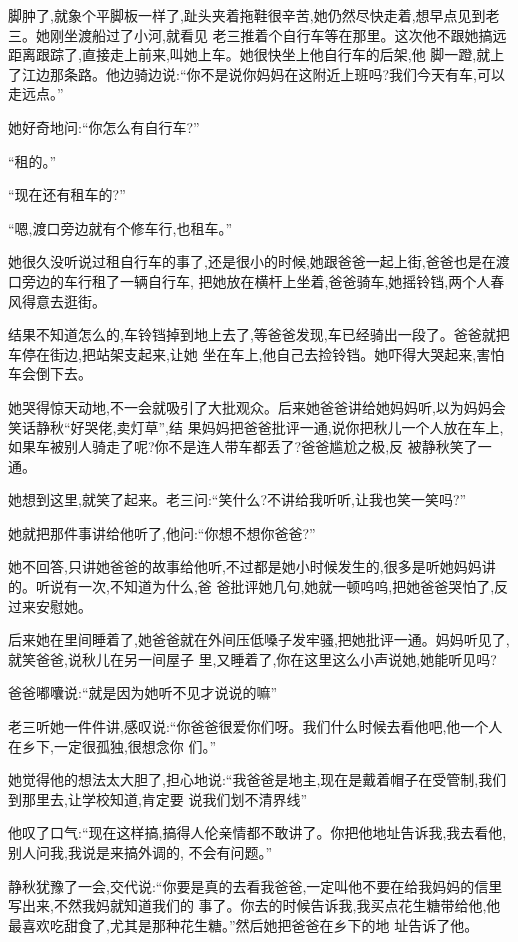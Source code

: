 ﻿\documentclass[12pt]{article}
\begin{document}
脚肿了,就象个平脚板一样了,趾头夹着拖鞋很辛苦,她仍然尽快走着,想早点见到老三。她刚坐渡船过了小河,就看见
老三推着个自行车等在那里。这次他不跟她搞远距离跟踪了,直接走上前来,叫她上车。她很快坐上他自行车的后架,他
脚一蹬,就上了江边那条路。他边骑边说:``你不是说你妈妈在这附近上班吗?我们今天有车,可以走远点。''

她好奇地问:``你怎么有自行车?''

``租的。''

``现在还有租车的?''

``嗯,渡口旁边就有个修车行,也租车。''

她很久没听说过租自行车的事了,还是很小的时候,她跟爸爸一起上街,爸爸也是在渡口旁边的车行租了一辆自行车,
把她放在横杆上坐着,爸爸骑车,她摇铃铛,两个人春风得意去逛街。

结果不知道怎么的,车铃铛掉到地上去了,等爸爸发现,车已经骑出一段了。爸爸就把车停在街边,把站架支起来,让她
坐在车上,他自己去捡铃铛。她吓得大哭起来,害怕车会倒下去。

她哭得惊天动地,不一会就吸引了大批观众。后来她爸爸讲给她妈妈听,以为妈妈会笑话静秋``好哭佬,卖灯草'',结
果妈妈把爸爸批评一通,说你把秋儿一个人放在车上,如果车被别人骑走了呢?你不是连人带车都丢了?爸爸尴尬之极,反
被静秋笑了一通。

她想到这里,就笑了起来。老三问:``笑什么?不讲给我听听,让我也笑一笑吗?''

她就把那件事讲给他听了,他问:``你想不想你爸爸?''

她不回答,只讲她爸爸的故事给他听,不过都是她小时候发生的,很多是听她妈妈讲的。听说有一次,不知道为什么,爸
爸批评她几句,她就一顿呜呜,把她爸爸哭怕了,反过来安慰她。

后来她在里间睡着了,她爸爸就在外间压低嗓子发牢骚,把她批评一通。妈妈听见了,就笑爸爸,说秋儿在另一间屋子
里,又睡着了,你在这里这么小声说她,她能听见吗?

爸爸嘟囔说:``就是因为她听不见才说说的嘛\myrule ''

老三听她一件件讲,感叹说:``你爸爸很爱你们呀。我们什么时候去看他吧,他一个人在乡下,一定很孤独,很想念你
们。''

她觉得他的想法太大胆了,担心地说:``我爸爸是地主,现在是戴着帽子在受管制,我们到那里去,让学校知道,肯定要
说我们划不清界线\myrule ''

他叹了口气:``现在这样搞,搞得人伦亲情都不敢讲了。你把他地址告诉我,我去看他,别人问我,我说是来搞外调的,
不会有问题。''

静秋犹豫了一会,交代说:``你要是真的去看我爸爸,一定叫他不要在给我妈妈的信里写出来,不然我妈就知道我们的
事了。你去的时候告诉我,我买点花生糖带给他,他最喜欢吃甜食了,尤其是那种花生糖。''然后她把爸爸在乡下的地
址告诉了他。
\end{document}

